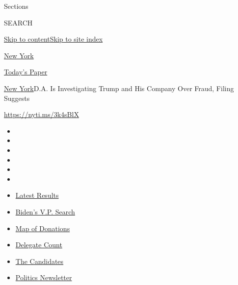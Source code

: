 Sections

SEARCH

\protect\hyperlink{site-content}{Skip to
content}\protect\hyperlink{site-index}{Skip to site index}

\href{https://www.nytimes3xbfgragh.onion/section/nyregion}{New York}

\href{https://myaccount.nytimes3xbfgragh.onion/auth/login?response_type=cookie\&client_id=vi}{}

\href{https://www.nytimes3xbfgragh.onion/section/todayspaper}{Today's
Paper}

\href{/section/nyregion}{New York}\textbar{}D.A. Is Investigating Trump
and His Company Over Fraud, Filing Suggests

\url{https://nyti.ms/3k4sBlX}

\begin{itemize}
\item
\item
\item
\item
\item
\item
\end{itemize}

\begin{itemize}
\item
  \href{https://www.nytimes3xbfgragh.onion/interactive/2020/08/04/us/elections/results-arizona-kansas-michigan-missouri-primaries.html?action=click\&pgtype=Article\&state=default\&region=TOP_BANNER\&context=storylines_menu}{Latest
  Results}
\item
  \href{https://www.nytimes3xbfgragh.onion/article/biden-vice-president-2020.html?action=click\&pgtype=Article\&state=default\&region=TOP_BANNER\&context=storylines_menu}{Biden's
  V.P. Search}
\item
  \href{https://www.nytimes3xbfgragh.onion/interactive/2020/07/24/us/politics/trump-biden-campaign-donors.html?action=click\&pgtype=Article\&state=default\&region=TOP_BANNER\&context=storylines_menu}{Map
  of Donations}
\item
  \href{https://www.nytimes3xbfgragh.onion/interactive/2020/us/elections/delegate-count-primary-results.html?action=click\&pgtype=Article\&state=default\&region=TOP_BANNER\&context=storylines_menu}{Delegate
  Count}
\item
  \href{https://www.nytimes3xbfgragh.onion/interactive/2019/us/politics/2020-presidential-candidates.html?action=click\&pgtype=Article\&state=default\&region=TOP_BANNER\&context=storylines_menu}{The
  Candidates}
\item
  \href{https://www.nytimes3xbfgragh.onion/newsletters/politics?action=click\&pgtype=Article\&state=default\&region=TOP_BANNER\&context=storylines_menu}{Politics
  Newsletter}
\end{itemize}

